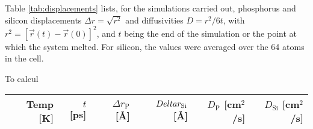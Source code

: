 \documentclass[11pt,bibliography=totoc,index=totoc]{scrbook}   %
\begin{document}
Table \ref{tab:displacements} lists, for the simulations carried out, phosphorus and silicon displacements $\Delta r = \sqrt{r^2}$
and diffusivities $D = r^2 / 6t$, with $r^2 = [\vec{r}(t) - \vec{r}(0)]^2$,
and $t$ being the end of the simulation or the point at which the system melted.
For silicon, the values were averaged over the 64 atoms in the cell. 

To calcul


\begin{table}[htbp]
  \centering
  \begin{tabular}{rrrrrr}
    \toprule
    Temp [K] & $t$ [ps] & $\Delta r_{\text{P}}$ [Å] & $\\Delta r_{\text{Si}}$ [Å] & $D_{\text{P}}$ [cm$^2$/s] & $D_{\text{Si}}$ [cm$^2$/s] \\
    \midrule

\end{tabular}
\end{table}
\end{document}
